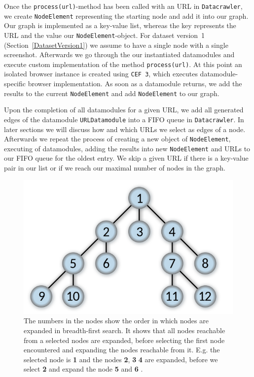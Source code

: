Once the \texttt{process(url)}-method has been called with an URL in \texttt{Datacrawler}, we create \texttt{NodeElement} representing the starting node and add it into our graph. Our graph is implemented as a key-value list, whereas the key represents the URL and the value our \texttt{NodeElement}-object. For dataset version~1 (Section~\ref{DatasetVersion1}) we assume to have a single node with a single screenshot. Afterwards we go through the our instantiated datamodules and execute custom implementation of the method \texttt{process(url)}. At this point an isolated browser instance is created using \texttt{CEF 3}, which executes datamodule-specific browser implementation. As soon as a datamodule returns, we add the results to the current \texttt{NodeElement} and add \texttt{NodeElement} to our graph. 

Upon the completion of all datamodules for a given URL, we add all generated edges of the datamodule \texttt{URLDatamodule} into a FIFO queue in \texttt{Datacrawler}. In later sections we will discuss how and which URLs we select as edges of a node. Afterwards we repeat the process of creating a new object of \texttt{NodeElement}, executing of datamodules, adding the results into new \texttt{NodeElement} and URLs to our FIFO queue for the oldest entry. We skip a given URL if there is a key-value pair in our list or if we reach our maximal number of nodes in the graph.

\begin{figure}
	\centering
	\includegraphics[scale=0.35]{resources/breadth-first}
	\caption[Illustration of the breadth-first search algorithm]{ The numbers in the nodes show the order in which nodes are expanded in breadth-first search. It shows that all nodes reachable from a selected nodes are expanded, before selecting the first node encountered and expanding the nodes reachable from it. E.g. the selected node is \textbf{1} and the nodes \textbf{2}, \textbf{3} \textbf{4} are expanded, before we select \textbf{2} and expand the node \textbf{5} and \textbf{6} \cite{wiki:Breadth-first_search}.}
	\label{datacrawler_breadth_search}
\end{figure}

